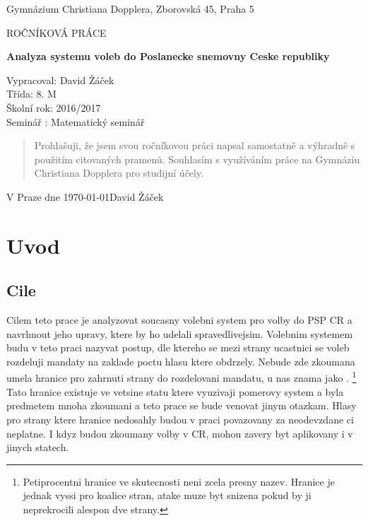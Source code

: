 \documentclass[12pt,a4paper]{report}
\begin{document}
\begin{titlepage}
	\begin{center}
	{\large Gymnázium Christiana Dopplera, Zborovská 45, Praha 5 \par}
	\vfill
	\par\vspace{1cm}
	{\scshape\LARGE ROČNÍKOVÁ PRÁCE \par}
	{\huge\bfseries Analyza systemu voleb do Poslanecke snemovny Ceske republiky\par}
	\vfill
\end{center}
Vypracoval: David Žáček \\
Třída: 8. M \\
Školní rok: 2016/2017 \\
Seminář : Matematický seminář \\
	\vfill
\end{titlepage}

\vspace*{\fill}
\begin{quote}
Prohlašuji, že jsem svou ročníkovou práci napsal samostatně a výhradně s
použitím 
citovaných pramenů. Souhlasím s
využíváním 
práce na Gymnáziu Christiana Dopplera 
pro studijní účely. \\
\end{quote}

V Praze dne \today \hfill David Žáček

\vspace*{\fill}
\thispagestyle{empty}
\newpage
\tableofcontents
\newpage
\chapter{Uvod}
\section{Cile}
Cilem teto prace je analyzovat soucasny volebni system  pro volby do PSP CR a navrhnout jeho upravy, ktere by ho udelali spravedlivejsim. 
Volebnim systemem budu v teto praci nazyvat postup, dle ktereho se mezi strany ucastnici se voleb rozdeluji mandaty na zaklade poctu hlasu ktere obdrzely. 
Nebude zde zkoumana umela hranice pro zahrnuti strany do rozdelovani mandatu, u nas znama jako .
\footnote{Petiprocentni hranice ve skutecnosti neni zcela presny nazev. Hranice je jednak vyssi pro koalice stran, atake muze byt snizena pokud by ji neprekrocili alespon dve strany.\autocite{ZAK}}
Tato hranice existuje ve vetsine statu ktere vyuzivaji pomerovy system a byla predmetem mnoha zkoumani a teto prace se bude venovat jinym otazkam.
Hlasy pro strany ktere hranice nedosahly budou v praci povazovany za neodevzdane ci neplatne.
I kdyz budou zkoumany volby v CR, mohou zavery byt aplikovany i v jinych statech. 
\end{document}
